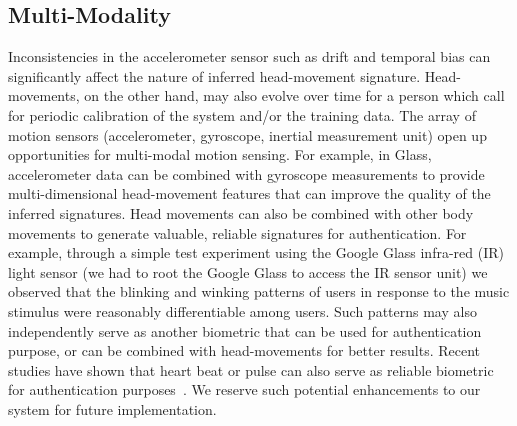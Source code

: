 \subsection{Multi-Modality}
Inconsistencies in the accelerometer sensor such as drift and temporal bias can
significantly affect the nature of inferred head-movement signature.
Head-movements, on the other hand, may also evolve over time for a person
which call for periodic calibration of the system and/or the training data.
The array of motion sensors (accelerometer, gyroscope, inertial measurement 
unit) open up opportunities for multi-modal motion sensing. For example,
in Glass, accelerometer data can be combined with gyroscope measurements to 
provide multi-dimensional head-movement features that can improve the quality 
of the inferred signatures. Head movements can also be combined with other 
body movements to generate valuable, reliable signatures for authentication. 
For example, through a simple test experiment using the Google Glass
infra-red (IR) light sensor (we had to root the Google Glass to access the
IR sensor unit) we observed that the blinking and winking patterns of users in
response to the music stimulus were reasonably differentiable among users.
Such patterns may also independently serve as another biometric that can be
used for authentication purpose, or can be combined with head-movements for better results.
Recent studies have shown that heart beat or pulse can also serve as reliable
biometric for authentication purposes~\cite{hernandezbioglass,nymi}.
We reserve such potential enhancements to our system for future implementation.

\iffalse

